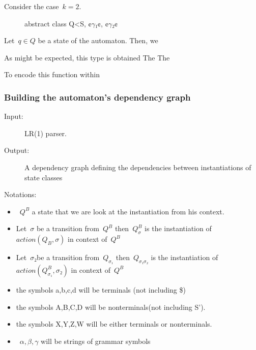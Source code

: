 Consider the case~$k=2$.
\begin{figure}
\begin{JAVA}
abstract class Q<S, ¢$γ₁$¢, ¢$γ₂$¢
\end{JAVA}
\end{figure}

Let~$q∈Q$ be a state of the automaton. Then, we

  As might be expected, this type is obtained
  The
  The

To encode this function within

\subsubsection{Building the automaton's dependency graph}

\begin{description}
  \item [Input:] LR(1) parser.
  \item [Output:] A dependency graph defining the dependencies between
  instantiations of state classes
  \item [Notations:]
\end{description}
\begin{itemize}
  \item~$Q^B$ a state that we are look at the instantiation from his context.
  \item Let~$σ$ be a transition from~$Q^B$ then~$Q_σ^B$
        is the instantiation of~$action(Q_B,σ)$ in context
        of~$Q^B$
  \item Let~$σ₂$be a transition from~$Q_{σ₁}$ then~$Q_{σ₁σ₂}$
        is the instantiation of~$action(Q_{σ₁}^B,σ₂)$
        in context of~$Q^B$
  \item the symbols a,b,c,d will be terminals (not including \$)
  \item the symbols A,B,C,D will be nonterminals(not including S').
  \item the symbols X,Y,Z,W will be either terminals or nonterminals.
        \item~$α,β,γ$ will be strings of grammar symbols
\end{itemize}

